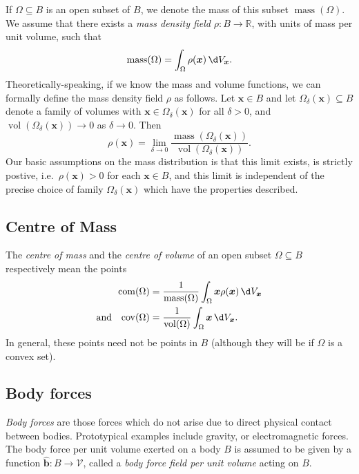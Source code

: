 \documentclass[
  letterpaper,
  DIV=11,
  numbers=noendperiod]{scrreprt}
\theoremstyle{plain}
\theoremstyle{remark}
\begin{document}
If \(\Omega\subseteq B\) is an open subset of \(B\), we denote the mass
of this subset \({\operatorname{mass}}(\Omega)\). We assume that there
exists a \emph{mass density field} \(\rho:B\to{\mathbb{R}}\), with units
of mass per unit volume, such that
\[{\operatorname{mass}}(\Omega) = \int_\Omega \rho({\boldsymbol{x}}){\,\d V_{{\boldsymbol{x}}}}.\]
Theoretically-speaking, if we know the mass and volume functions, we can
formally define the mass density field \(\rho\) as follows. Let
\({\boldsymbol{x}}\in B\) and let
\(\Omega_\delta({\boldsymbol{x}})\subseteq B\) denote a family of
volumes with \({\boldsymbol{x}}\in\Omega_\delta({\boldsymbol{x}})\) for
all \(\delta>0\), and
\({\operatorname{vol}}(\Omega_\delta({\boldsymbol{x}}))\to0\) as
\(\delta\to0\). Then
\[\rho({\boldsymbol{x}}) = \lim_{\delta\to 0} \frac{{\operatorname{mass}}(\Omega_\delta({\boldsymbol{x}}))}{{\operatorname{vol}}(\Omega_\delta({\boldsymbol{x}}))}.\]
Our basic assumptions on the mass distribution is that this limit
exists, is strictly postive, i.e.~\(\rho({\boldsymbol{x}})>0\) for each
\({\boldsymbol{x}}\in B\), and this limit is independent of the precise
choice of family \(\Omega_\delta({\boldsymbol{x}})\) which have the
properties described.

\subsection{Centre of Mass}\label{centre-of-mass}

The \emph{centre of mass} and the \emph{centre of volume} of an open
subset \(\Omega\subseteq B\) respectively mean the points \[
\begin{aligned}
{\operatorname{com}}(\Omega) &= \frac{1}{{\operatorname{mass}}(\Omega)}\int_\Omega {\boldsymbol{x}}\rho({\boldsymbol{x}}){\,\d V_{{\boldsymbol{x}}}}\\
  \text{and}\quad {\operatorname{cov}}(\Omega) &= \frac{1}{{\operatorname{vol}}(\Omega)}\int_\Omega {\boldsymbol{x}}{\,\d V_{{\boldsymbol{x}}}}.
\end{aligned}\] In general, these points need not be points in \(B\)
(although they will be if \(\Omega\) is a convex set).

\subsection{Body forces}\label{body-forces}

\emph{Body forces} are those forces which do not arise due to direct
physical contact between bodies. Prototypical examples include gravity,
or electromagnetic forces. The body force per unit volume exerted on a
body \(B\) is assumed to be given by a function
\(\widehat{{\boldsymbol{b}}}:B\to{\mathcal{V}}\), called a \emph{body
force field per unit volume} acting on \(B\).
\end{document}
